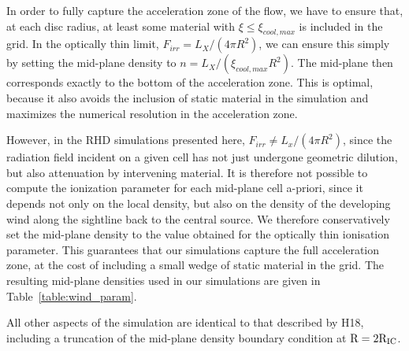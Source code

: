 \documentclass[a4paper,fleqn,usenatbib]{mnras}
\begin{document}
In order to fully capture the acceleration zone of the flow, we have
to ensure that, at each disc radius, at least some material with $\xi \leq
\xi_{cool,max}$ is included in the grid. In the optically thin limit,
$F_{irr} = L_X / (4\pi R^2)$, we can ensure this simply by setting the 
mid-plane density to $n = L_X / (\xi_{cool,max} R^2)$. The
mid-plane then corresponds exactly to the bottom of the acceleration
zone. This is optimal, because it also avoids the inclusion of static
material in the simulation and maximizes the numerical resolution in
the acceleration zone.

However, in the RHD simulations presented here, $F_{irr} \neq L_x /
(4\pi R^2)$, since the radiation field incident on a given cell has
not just undergone geometric dilution, but also attenuation by
intervening material. It is therefore not possible to  
compute the ionization parameter for each mid-plane cell a-priori, since it
depends not only on the local density, but also on the density of the
developing wind along the sightline back to the central source. We
therefore conservatively set the mid-plane density to the value
obtained for the optically thin ionisation parameter. This guarantees
that our simulations capture the full acceleration zone, at the cost
of including a small wedge of static material in the grid. The
resulting mid-plane densities used in our simulations are given in
Table~\ref{table:wind_param}.

All other aspects of the simulation are identical to that described by
H18, including a truncation of the  mid-plane density boundary
condition at $\rm{R=2 R_{IC}}$.
\end{document}
